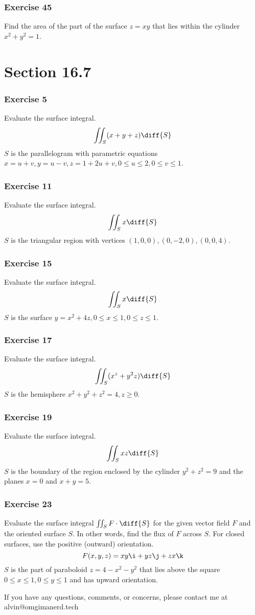 \documentclass{math}
\begin{document}
\subsubsection*{Exercise 45}
Find the area of the part of the surface \( z = xy \) that lies within the
cylinder \( x^2+y^2 = 1 \).

\section*{Section 16.7}

\subsubsection*{Exercise 5}
Evaluate the surface integral.
\[ \iint_{S}(x+y+z)\diff{S} \]
\( S \) is the parallelogram with parametric equations \( x = u+v, y = u-v,
z = 1+2u+v, 0\le u\le 2, 0\le v\le 1 \).

\subsubsection*{Exercise 11}
Evaluate the surface integral.
\[ \iint_{S}x\diff{S} \]
\( S \) is the triangular region with vertices \( (1,0,0),(0,-2,0),(0,0,4) \).

\subsubsection*{Exercise 15}
Evaluate the surface integral.
\[ \iint_{S}x\diff{S} \]
\( S \) is the surface \( y = x^2+4z,0\le x\le1,0\le z\le 1 \).

\subsubsection*{Exercise 17}
Evaluate the surface integral.
\[ \iint_{S}(x^z+y^2z)\diff{S} \]
\( S \) is the hemisphere \( x^2+y^2+z^2 = 4, z\ge0 \).

\subsubsection*{Exercise 19}
Evaluate the surface integral.
\[ \iint_{S}xz\diff{S} \]
\( S \) is the boundary of the region enclosed by the cylinder \( y^2+z^2 = 9 \)
and the planes \( x = 0 \) and \( x+y = 5 \).

\subsubsection*{Exercise 23}
Evaluate the surface integral \( \iint_{S}F\cdot\diff{S} \) for the given vector
field \( F \) and the oriented surface \( S \). In other words, find the flux of
\( F \) across \( S \). For closed surfaces, use the positive (outward)
orientation.
\[ F(x,y,z) = xy\i+yz\j+zx\k \]
\( S \) is the part of paraboloid \( z = 4-x^2-y^2 \) that lies above the square
\( 0\le x\le1,0\le y\le1 \) and has upward orientation.

\begin{center}
  If you have any questions, comments, or concerns, please contact me at
  alvin@omgimanerd.tech
\end{center}
\end{document}
